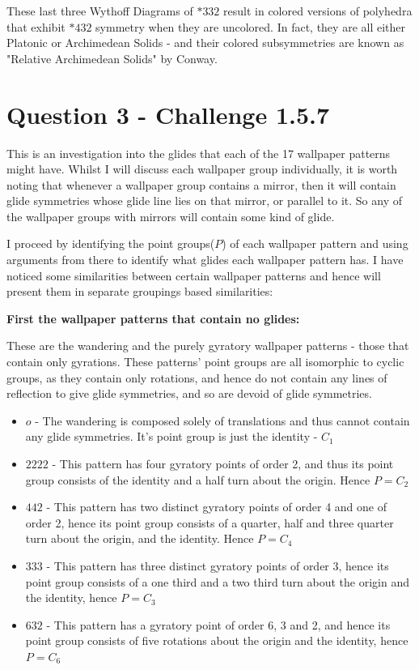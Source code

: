 \documentclass{article}
\begin{document}
\begin{figure}[htbp]
\begin{minipage}{0.3\textwidth}
    \end{minipage}
    
\end{figure}


These last three Wythoff Diagrams of $*332$ result in colored versions of polyhedra that exhibit $*432$ symmetry when they are uncolored. In fact, they are all either Platonic or Archimedean Solids - and their colored subsymmetries are known as "Relative Archimedean Solids" by Conway. 


\section{Question 3 - Challenge 1.5.7}
This is an investigation into the glides that each of the 17 wallpaper patterns might have.
Whilst I will discuss each wallpaper group individually, it is worth noting that whenever a wallpaper group contains a mirror, then it will contain glide symmetries whose glide line lies on that mirror, or parallel to it. So any of the wallpaper groups with mirrors will contain some kind of glide.

I proceed by identifying the point groups($P$) of each wallpaper pattern and using arguments from there to identify what glides each wallpaper pattern has. I have noticed some similarities between certain wallpaper patterns and hence will present them in separate groupings based similarities:

\textbf{First the wallpaper patterns that contain no glides:}

These are the wandering and the purely gyratory wallpaper patterns - those that contain only gyrations. These patterns' point groups are all isomorphic to cyclic groups, as they contain only rotations, and hence do not contain any  lines of reflection to give glide symmetries, and so are devoid of glide symmetries.
\begin{itemize}
  \item $o$ - The wandering is composed solely of translations and thus cannot contain any glide symmetries. It's point group is just the identity - $C_1$

 \item $2222$ - This pattern has four gyratory points of order 2, and thus its point group consists of the identity and a half turn about the origin. Hence $P = C_2$

\item$442$ - This pattern has two distinct gyratory points of order 4 and one of order 2, hence its point group consists of a quarter, half and three quarter turn about the origin, and the identity. Hence $P = C_4$

\item$333$ - This pattern has three distinct gyratory points of order 3, hence its point group consists of a one third and a two third turn about the origin and the identity, hence $P = C_3$

\item$632$ - This pattern has a gyratory point of order 6, 3 and 2, and hence its point group consists of five rotations about the origin and the identity, hence $P = C_6$
\end{itemize}
\end{document}
